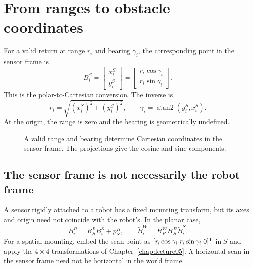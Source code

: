 \section{From ranges to obstacle coordinates}
For a valid return at range $r_i$ and bearing $\gamma_i$, the corresponding
point in the sensor frame is
\begin{equation}
 \boxed{B_i^S=\begin{bmatrix}x_i^S\\y_i^S\end{bmatrix}
 =\begin{bmatrix}r_i\cos\gamma_i\\r_i\sin\gamma_i\end{bmatrix}.}
 \label{eq:l06-polar}
\end{equation}
This is the polar-to-Cartesian conversion. The inverse is
\begin{equation}
 r_i=\sqrt{(x_i^S)^2+(y_i^S)^2},\qquad
 \gamma_i=\operatorname{atan2}(y_i^S,x_i^S).
 \label{eq:l06-cartesian}
\end{equation}
At the origin, the range is zero and the bearing is geometrically undefined.

\begin{figure}[htbp]
\centering
\caption{A valid range and bearing determine Cartesian coordinates in the
sensor frame. The projections give the cosine and sine components.}
\label{fig:l06-polar}
\end{figure}

\subsection{The sensor frame is not necessarily the robot frame}
A sensor rigidly attached to a robot has a fixed mounting transform, but
its axes and origin need not coincide with the robot's. In the planar case,
\begin{equation}
 B_i^R=R_S^R B_i^S+p_S^R,\qquad
 \widetilde B_i^W=H_R^W H_S^R\widetilde B_i^S.
 \label{eq:l06-frames}
\end{equation}
For a spatial mounting, embed the scan point as
$[r_i\cos\gamma_i\;r_i\sin\gamma_i\;0]^{\mathsf T}$ in $S$ and apply the
$4\times4$ transformations of Chapter~\ref{chap:lecture05}. A horizontal
scan in the sensor frame need not be horizontal in the world frame.

